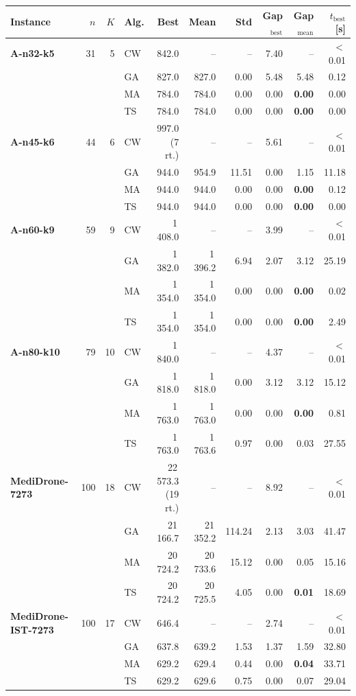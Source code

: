 \begin{tabular}{@{}l r r l r r r r r r@{}}
\toprule
Instance & $n$ & $K$ & Alg. & Best & Mean & Std & Gap$_{\text{best}}$ & Gap$_{\text{mean}}$ & $t_{\text{best}}$ [s] \\
\midrule
\textbf{A-n32-k5} & 31 & 5 & CW & 842.0 & -- & -- & 7.40 & -- & $<$0.01 \\
 & & & GA & 827.0 & 827.0 & 0.00 & 5.48 & {5.48} & 0.12 \\
 & & & MA & 784.0 & 784.0 & 0.00 & 0.00 & \textbf{0.00} & 0.00 \\
 & & & TS & 784.0 & 784.0 & 0.00 & 0.00 & \textbf{0.00} & 0.00 \\
\addlinespace[2pt]
\textbf{A-n45-k6} & 44 & 6 & CW & 997.0 (7 rt.) & -- & -- & 5.61 & -- & $<$0.01 \\
 & & & GA & 944.0 & 954.9 & 11.51 & 0.00 & {1.15} & 11.18 \\
 & & & MA & 944.0 & 944.0 & 0.00 & 0.00 & \textbf{0.00} & 0.12 \\
 & & & TS & 944.0 & 944.0 & 0.00 & 0.00 & \textbf{0.00} & 0.00 \\
\addlinespace[2pt]
\textbf{A-n60-k9} & 59 & 9 & CW & 1\,408.0 & -- & -- & 3.99 & -- & $<$0.01 \\
 & & & GA & 1\,382.0 & 1\,396.2 & 6.94 & 2.07 & {3.12} & 25.19 \\
 & & & MA & 1\,354.0 & 1\,354.0 & 0.00 & 0.00 & \textbf{0.00} & 0.02 \\
 & & & TS & 1\,354.0 & 1\,354.0 & 0.00 & 0.00 & \textbf{0.00} & 2.49 \\
\addlinespace[2pt]
\textbf{A-n80-k10} & 79 & 10 & CW & 1\,840.0 & -- & -- & 4.37 & -- & $<$0.01 \\
 & & & GA & 1\,818.0 & 1\,818.0 & 0.00 & 3.12 & {3.12} & 15.12 \\
 & & & MA & 1\,763.0 & 1\,763.0 & 0.00 & 0.00 & \textbf{0.00} & 0.81 \\
 & & & TS & 1\,763.0 & 1\,763.6 & 0.97 & 0.00 & {0.03} & 27.55 \\
\addlinespace[2pt]
\textbf{MediDrone-7273} & 100 & 18 & CW & 22\,573.3 (19 rt.) & -- & -- & 8.92 & -- & $<$0.01 \\
 & & & GA & 21\,166.7 & 21\,352.2 & 114.24 & 2.13 & {3.03} & 41.47 \\
 & & & MA & 20\,724.2 & 20\,733.6 & 15.12 & 0.00 & {0.05} & 15.16 \\
 & & & TS & 20\,724.2 & 20\,725.5 & 4.05 & 0.00 & \textbf{0.01} & 18.69 \\
\addlinespace[2pt]
\textbf{MediDrone-IST-7273} & 100 & 17 & CW & 646.4 & -- & -- & 2.74 & -- & $<$0.01 \\
 & & & GA & 637.8 & 639.2 & 1.53 & 1.37 & {1.59} & 32.80 \\
 & & & MA & 629.2 & 629.4 & 0.44 & 0.00 & \textbf{0.04} & 33.71 \\
 & & & TS & 629.2 & 629.6 & 0.75 & 0.00 & {0.07} & 29.04 \\
\bottomrule
\end{tabular}
